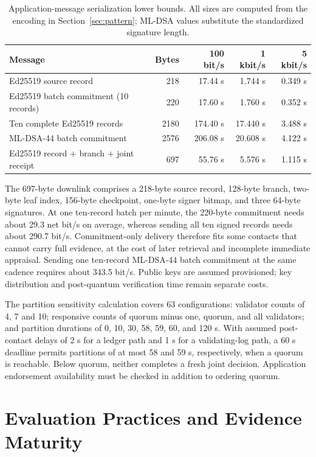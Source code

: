 \documentclass[blockchains,review,accept,moreauthors]{Definitions/mdpi}
\begin{document}
\begin{table}[!htb]
\caption{Application-message serialization lower bounds. All sizes are computed from the encoding in Section~\ref{sec:pattern}; ML-DSA values substitute the standardized signature length.\label{tab:budget}}
\begin{tabularx}{\textwidth}{@{}Yrrrr@{}}
\toprule
\textbf{Message} & \textbf{Bytes} & \textbf{100 bit/s} & \textbf{1 kbit/s} & \textbf{5 kbit/s}\\
\midrule
Ed25519 source record & 218 & 17.44 s & 1.744 s & 0.349 s\\
Ed25519 batch commitment (10 records) & 220 & 17.60 s & 1.760 s & 0.352 s\\
Ten complete Ed25519 records & 2180 & 174.40 s & 17.440 s & 3.488 s\\
ML-DSA-44 batch commitment & 2576 & 206.08 s & 20.608 s & 4.122 s\\
Ed25519 record + branch + joint receipt & 697 & 55.76 s & 5.576 s & 1.115 s\\
\bottomrule
\end{tabularx}
\end{table}

The 697-byte downlink comprises a 218-byte source record, 128-byte branch, two-byte leaf index, 156-byte checkpoint, one-byte signer bitmap, and three 64-byte signatures. At one ten-record batch per minute, the 220-byte commitment needs about 29.3 net bit/s on average, whereas sending all ten signed records needs about 290.7 bit/s. Commitment-only delivery therefore fits some contacts that cannot carry full evidence, at the cost of later retrieval and incomplete immediate appraisal. Sending one ten-record ML-DSA-44 batch commitment at the same cadence requires about 343.5 bit/s. Public keys are assumed provisioned; key distribution and post-quantum verification time remain separate costs.

The partition sensitivity calculation covers 63 configurations: validator counts of 4, 7 and 10; responsive counts of quorum minus one, quorum, and all validators; and partition durations of 0, 10, 30, 58, 59, 60, and 120 s. With assumed post-contact delays of 2 s for a ledger path and 1 s for a validating-log path, a 60 s deadline permits partitions of at most 58 and 59 s, respectively, when a quorum is reachable. Below quorum, neither completes a fresh joint decision. Application endorsement availability must be checked in addition to ordering quorum.


\section{Evaluation Practices and Evidence Maturity}
\end{document}
